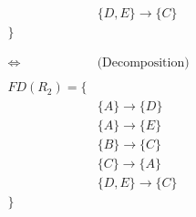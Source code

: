\begin{itemize}
\begin{align*}
& \{D, E\} \rightarrow \{C\} \\
\} & \\ \\ \\
\Leftrightarrow & \text{(Decomposition)} \\ \\
FD(R_2) = \{ & \\
& \{A\} \rightarrow \{D\} \\
& \{A\} \rightarrow \{E\} \\
& \{B\} \rightarrow \{C\} \\
& \{C\} \rightarrow \{A\} \\
& \{D, E\} \rightarrow \{C\} \\
\} & \\ \\ \\
\end{align*}

\end{itemize}




